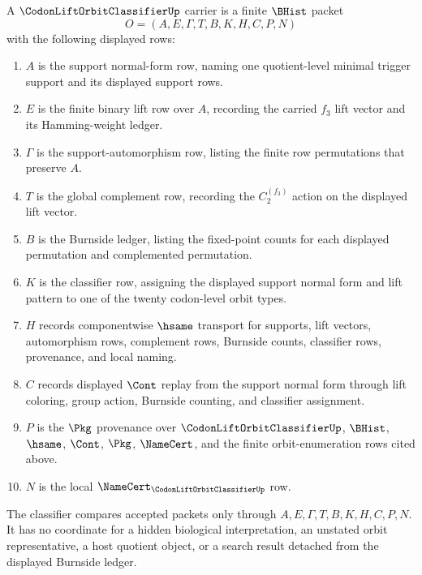 \begin{definition}
\label{def:codon-lift-orbit-classifier-carrier}
A $\CodonLiftOrbitClassifierUp$ carrier is a finite $\BHist$ packet
$$
O=(A,E,\Gamma,T,B,K,H,C,P,N)
$$
with the following displayed rows:
\begin{enumerate}
\item $A$ is the support normal-form row, naming one quotient-level minimal trigger support and its displayed support rows.
\item $E$ is the finite binary lift row over $A$, recording the carried $f_{3}$ lift vector and its Hamming-weight ledger.
\item $\Gamma$ is the support-automorphism row, listing the finite row permutations that preserve $A$.
\item $T$ is the global complement row, recording the $C_{2}^{(f_{3})}$ action on the displayed lift vector.
\item $B$ is the Burnside ledger, listing the fixed-point counts for each displayed permutation and complemented permutation.
\item $K$ is the classifier row, assigning the displayed support normal form and lift pattern to one of the twenty codon-level orbit types.
\item $H$ records componentwise $\hsame$ transport for supports, lift vectors, automorphism rows, complement rows, Burnside counts, classifier rows, provenance, and local naming.
\item $C$ records displayed $\Cont$ replay from the support normal form through lift coloring, group action, Burnside counting, and classifier assignment.
\item $P$ is the $\Pkg$ provenance over $\CodonLiftOrbitClassifierUp$, $\BHist$, $\hsame$, $\Cont$, $\Pkg$, $\NameCert$, and the finite orbit-enumeration rows cited above.
\item $N$ is the local $\NameCert_{\CodonLiftOrbitClassifierUp}$ row.
\end{enumerate}
The classifier compares accepted packets only through $A,E,\Gamma,T,B,K,H,C,P,N$. It has no coordinate for a hidden biological interpretation, an unstated orbit representative, a host quotient object, or a search result detached from the displayed Burnside ledger.
\end{definition}

